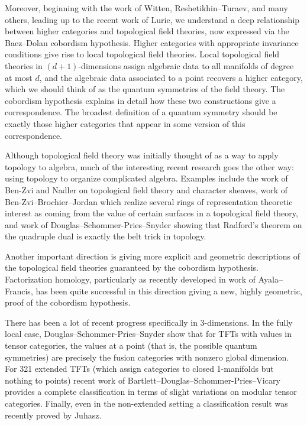 \documentclass[12pt]{article}
\begin{document}
Moreover, beginning with the work of Witten, Reshetikhin--Turaev, and many others, leading up to the recent work of Lurie, we understand a deep relationship between higher categories and topological field theories, now expressed via the Baez--Dolan cobordism hypothesis. Higher categories with appropriate invariance conditions give rise to local topological field theories. Local topological field theories in $(d+1)$-dimensions assign algebraic data to all manifolds of degree at most $d$, and the algebraic data associated to a point recovers a higher category, which we should think of as the quantum symmetries of the field theory. The cobordism hypothesis explains in detail how these two constructions give a correspondence. The broadest definition of a quantum symmetry should be exactly those higher categories that appear in some version of this correspondence.

Although topological field theory was initially thought of as a way to apply topology to algebra, much of the interesting recent research goes the other way: using topology to organize complicated algebra. Examples include the work of Ben-Zvi and Nadler on topological field theory and character sheaves, work of Ben-Zvi--Brochier--Jordan which realize several rings of representation theoretic interest as coming from the value of certain surfaces in a topological field theory, and work of Douglas--Schommer-Pries--Snyder showing that Radford's theorem on the quadruple dual is exactly the belt trick in topology.

Another important direction is giving more explicit and geometric descriptions of the topological field theories guaranteed by the cobordism hypothesis. Factorization homology, particularly as recently developed in work of Ayala--Francis, has been quite successful in this direction giving a new, highly geometric, proof of the cobordism hypothesis.

There has been a lot of recent progress specifically in $3$-dimensions. In the fully local case, Douglas--Schommer-Pries--Snyder show that for TFTs with values in tensor categories, the values at a point (that is, the possible quantum symmetries) are precisely the fusion categories with nonzero global dimension. For 321 extended TFTs (which assign categories to closed 1-manifolds but nothing to points) recent work of Bartlett--Douglas--Schommer-Pries--Vicary provides a complete classification in terms of slight variations on modular tensor categories.  Finally, even in the non-extended setting a classification result was recently proved by Juhasz.
\end{document}
